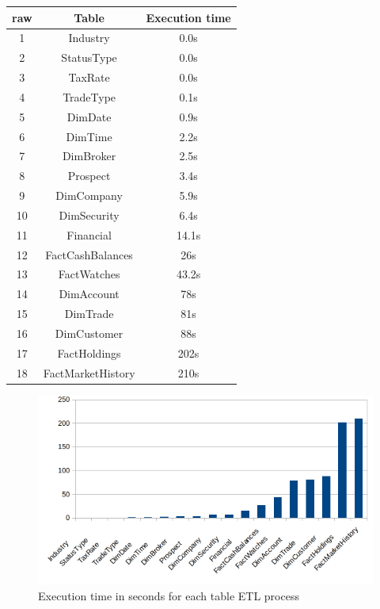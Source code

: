 \documentclass{article}
\begin{document}
\begin{table}[H]
\begin{center}
\begin{tabular}{|c|c|c|}
\hline
raw & Table             & Execution time \\ \hline
1   & Industry          & 0.0s           \\ \hline
2   & StatusType        & 0.0s           \\ \hline
3   & TaxRate           & 0.0s           \\ \hline
4   & TradeType         & 0.1s           \\ \hline
5   & DimDate           & 0.9s           \\ \hline
6   & DimTime           & 2.2s           \\ \hline
7   & DimBroker         & 2.5s           \\ \hline
8   & Prospect          & 3.4s            \\ \hline
9   & DimCompany        & 5.9s           \\ \hline
10  & DimSecurity       & 6.4s           \\ \hline
11  & Financial         & 14.1s          \\ \hline
12  & FactCashBalances  & 26s            \\ \hline
13  & FactWatches       & 43.2s          \\ \hline
14  & DimAccount        & 78s            \\ \hline
15  & DimTrade          & 81s            \\ \hline
16  & DimCustomer       & 88s            \\ \hline
17  & FactHoldings      & 202s           \\ \hline
18  & FactMarketHistory & 210s           \\ \hline
\end{tabular}
\end{center}
\end{table}


\begin{figure}[H]
    \centering
    \includegraphics[width=\textwidth]{images2/img.png} 
    \caption{Execution time in seconds for each table ETL process}
\end{figure}
\end{document}

